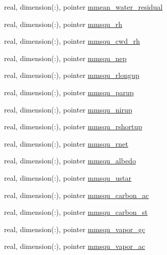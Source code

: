 \begin{DoxyCompactItemize}
real, dimension(\+:), pointer \hyperlink{structed__state__vars_1_1sitetype_a298197772a4585341e244e83eadb967c}{mmean\+\_\+water\+\_\+residual}
\item 
real, dimension(\+:), pointer \hyperlink{structed__state__vars_1_1sitetype_a3e4bda367b81a42060241a6aca1d1f8b}{mmsqu\+\_\+rh}
\item 
real, dimension(\+:), pointer \hyperlink{structed__state__vars_1_1sitetype_a1c85da04775e019c65ddbbe0e6e6bfb6}{mmsqu\+\_\+cwd\+\_\+rh}
\item 
real, dimension(\+:), pointer \hyperlink{structed__state__vars_1_1sitetype_a1ea861d12879d84d19c3578d2ff9ec18}{mmsqu\+\_\+nep}
\item 
real, dimension(\+:), pointer \hyperlink{structed__state__vars_1_1sitetype_a53f886be57a9a0d53bc34d08b50b913f}{mmsqu\+\_\+rlongup}
\item 
real, dimension(\+:), pointer \hyperlink{structed__state__vars_1_1sitetype_a19f88827d4f3e09cee6b89b388f30f64}{mmsqu\+\_\+parup}
\item 
real, dimension(\+:), pointer \hyperlink{structed__state__vars_1_1sitetype_ae442612c8bebe6f74556ba2add6b221f}{mmsqu\+\_\+nirup}
\item 
real, dimension(\+:), pointer \hyperlink{structed__state__vars_1_1sitetype_a041144ac62e7a651c94217aff89ab8c0}{mmsqu\+\_\+rshortup}
\item 
real, dimension(\+:), pointer \hyperlink{structed__state__vars_1_1sitetype_a70edfe4927e02e261063b2bccc2443cb}{mmsqu\+\_\+rnet}
\item 
real, dimension(\+:), pointer \hyperlink{structed__state__vars_1_1sitetype_a34ec41e6f243c7af98b8fa0a2c0c2d7e}{mmsqu\+\_\+albedo}
\item 
real, dimension(\+:), pointer \hyperlink{structed__state__vars_1_1sitetype_a9ca7b7502111f91bd1eb350e2e1538ad}{mmsqu\+\_\+ustar}
\item 
real, dimension(\+:), pointer \hyperlink{structed__state__vars_1_1sitetype_ace59b48796d710330c3bfbd46dfbdda5}{mmsqu\+\_\+carbon\+\_\+ac}
\item 
real, dimension(\+:), pointer \hyperlink{structed__state__vars_1_1sitetype_a8af529fc48e8208246becf7da2e6f5e3}{mmsqu\+\_\+carbon\+\_\+st}
\item 
real, dimension(\+:), pointer \hyperlink{structed__state__vars_1_1sitetype_af88a6b4526cb68d7fd1d11050b4555c1}{mmsqu\+\_\+vapor\+\_\+gc}
\item 
real, dimension(\+:), pointer \hyperlink{structed__state__vars_1_1sitetype_a96831fb35350111eb45268511b53fe7d}{mmsqu\+\_\+vapor\+\_\+ac}

\end{DoxyCompactItemize}
